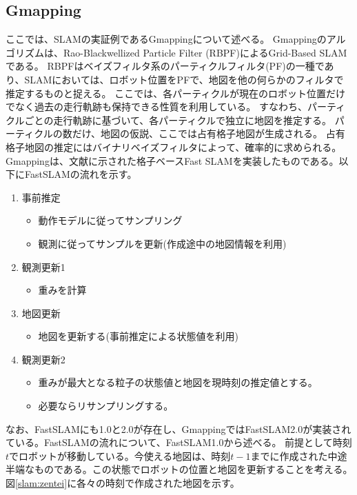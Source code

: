\subsection{Gmapping}
ここでは、SLAMの実証例であるGmappingについて述べる。
Gmappingのアルゴリズムは、Rao-Blackwellized Particle Filter (RBPF)によるGrid-Based SLAMである。
RBPFはベイズフィルタ系のパーティクルフィルタ(PF)の一種であり、SLAMにおいては、ロボット位置をPFで、地図を他の何らかのフィルタで推定するものと捉える。
ここでは、各パーティクルが現在のロボット位置だけでなく過去の走行軌跡も保持できる性質を利用している。
すなわち、パーティクルごとの走行軌跡に基づいて、各パーティクルで独立に地図を推定する。
パーティクルの数だけ、地図の仮説、ここでは占有格子地図が生成される。
占有格子地図の推定にはバイナリベイズフィルタによって、確率的に求められる。
Gmappingは、文献\cite{slam:gmapping}に示された格子ベースFast SLAMを実装したものである。以下にFastSLAMの流れを示す。

\begin{enumerate}
  \item 事前推定
  \begin{itemize}
    \item 動作モデルに従ってサンプリング
    \item 観測に従ってサンプルを更新(作成途中の地図情報を利用)
  \end{itemize}
  \item 観測更新1
  \begin{itemize}
    \item 重みを計算
  \end{itemize}
  \item 地図更新
  \begin{itemize}
    \item 地図を更新する(事前推定による状態値を利用)
  \end{itemize}
  \item 観測更新2
  \begin{itemize}
    \item 重みが最大となる粒子の状態値と地図を現時刻の推定値とする。
    \item 必要ならリサンプリングする。
  \end{itemize}
\end{enumerate}

なお、FastSLAMにも1.0と2.0が存在し、GmappingではFastSLAM2.0が実装されている。FastSLAMの流れについて、FastSLAM1.0から述べる。
前提として時刻$t$でロボットが移動している。今使える地図は、時刻$t-1$までに作成された中途半端なものである。この状態でロボットの位置と地図を更新することを考える。
図\ref{slam:zentei}に各々の時刻で作成された地図を示す。

